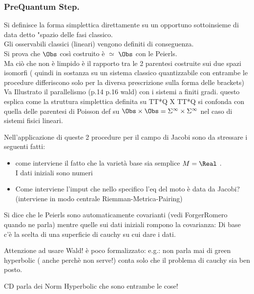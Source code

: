 \documentclass[Main]{subfiles}
\begin{document}
 			\subsubsection{PreQuantum Step.}
	\begin{Warning}
		Si definisce la forma simplettica direttamente su  un opportuno sottoinsieme di data detto "spazio delle fasi classico.\\
		Gli osservabili classici (lineari) vengono definiti di conseguenza.\\
		Si prova che $\Obs$ così costruito è $\simeq$ $\Obs$ con le Peierls.\\
		Ma ciò che non è limpido è il rapporto tra le 2 parentesi costruite sui due spazi isomorfi ( quindi in sostanza su un sistema classico quantizzabile con entrambe le procedure differiscono solo per la diversa prescrizione sulla forma delle brackets)\\
		
		Va Illustrato il parallelismo (p.14 p.16 wald) con i sistemi a finiti gradi. questo esplica come la struttura simplettica definita su TT*Q X TT*Q si confonda con quella delle parentesi di Poisson def su $\Obs \times \Obs = \Sigma^\infty \times \Sigma^\infty$ nel caso di sistemi fisici lineari.
		
		Nell'applicazione di queste 2 procedure  per il campo di Jacobi sono da stressare i seguenti fatti:
		\begin{itemize}
			\item come interviene il fatto che la varietà base sia semplice $M= \Real$ .\\
				I dati iniziali sono numeri
			\item Come interviene l'imput che nello specifico l'eq del moto è data da Jacobi?\\
				(interviene in modo centrale  Riemman-Metrica-Pairing)
		\end{itemize}
		
		Si dice che le Peierls sono automaticamente covarianti (vedi ForgerRomero quando ne parla) mentre quelle sui dati iniziali rompono la covarianza:
		Di base c'è la scelta di una superficie di cauchy su cui dare i dati.
		
		Attenzione ad usare Wald!  è poco formalizzato: e.g.: non parla mai di  green hyperbolic ( anche perchè non serve!) conta solo che il problema di cauchy sia ben posto.
		
		CD parla dei Norm Hyperbolic che sono entrambe le cose!
		

\end{Warning}
\end{document}
